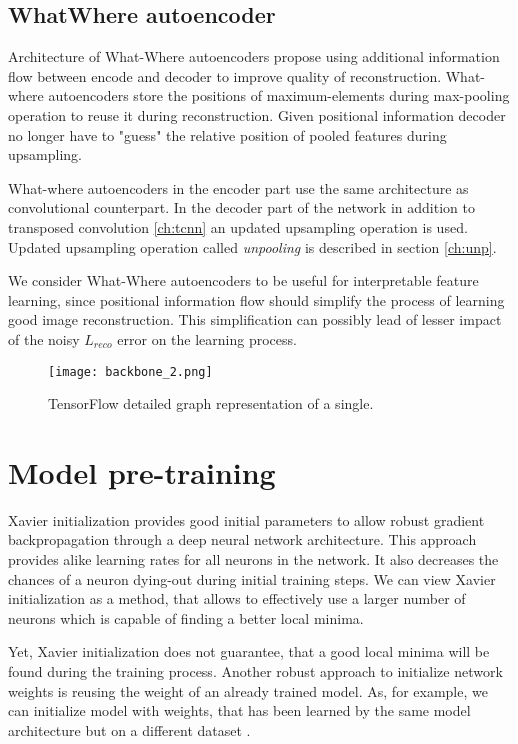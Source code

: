\subsection{WhatWhere autoencoder}

Architecture of What-Where autoencoders \cite{Zhao2015} propose using additional information flow between encode and decoder to improve quality of reconstruction.
What-where autoencoders store the positions of maximum-elements during max-pooling operation to reuse it during reconstruction.
Given positional information decoder no longer have to "guess" the relative position of pooled features during upsampling.

What-where autoencoders in the encoder part use the same architecture as convolutional counterpart.
In the decoder part of the network in addition to transposed convolution \ref{ch:tcnn} an updated upsampling operation is used. Updated upsampling operation called \textit{unpooling} is described in section \ref{ch:unp}.

We consider What-Where autoencoders to be useful for interpretable feature learning, since positional information flow should simplify the process of learning good image reconstruction. This simplification can possibly lead of lesser impact of the noisy $L_{reco}$ error on the learning process.

\begin{figure}[h!]
  \centering
    \texttt{[image: backbone\_2.png]}
  \caption{TensorFlow detailed graph representation of a single.}
  \label{fig:tf_graph}
\end{figure}

\section{Model pre-training}

Xavier initialization provides good initial parameters to allow robust gradient backpropagation through a deep neural network architecture.
This approach provides alike learning rates for all neurons in the network.
It also decreases the chances of a neuron dying-out during initial training steps.
We can view Xavier initialization as a method, that allows to effectively use a larger number of neurons which is capable of finding a better local minima.

Yet, Xavier initialization does not guarantee, that a good local minima will be found during the training process.
Another robust approach to initialize network weights is reusing the weight of an already trained model.
As, for example, we can initialize model with weights, that has been learned by the same model architecture but on a different dataset \cite{Yosinski2014}.

